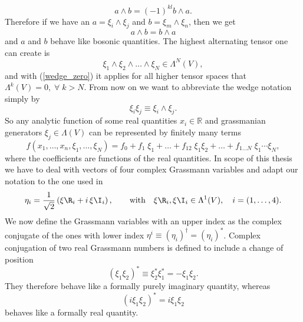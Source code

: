 \begin{equation}
a\wedge b = (-1)^{kl} b\wedge a.
\end{equation}
Therefore if we have an $a=\xi_{i}\wedge\xi_{j}$ and $b=\xi_{m}\wedge\xi_{n}$, then we get
\begin{equation}
a \wedge b = b \wedge a
\end{equation}
and $a$ and $b$ behave like bosonic quantities. The highest alternating tensor one can create is
\begin{equation}
\xi_{1}\wedge\xi_{2}\wedge \ldots\wedge \xi_{N} \in \Lambda^{N}(V),
\end{equation}
and with (\ref{wedge_zero}) it applies for all higher tensor spaces that $\Lambda^{k}(V)=0,\; \forall\; k>N$. From now on we want to abbreviate the wedge notation simply by
\begin{equation}
\xi_{i}\xi_{j} \equiv \xi_{i}\wedge\xi_{j}.
\end{equation}
So any analytic function of some real quantities $x_{i} \in \mathbb{R}$ and grassmanian generators $\xi_{j} \in \Lambda(V)$ can be represented by finitely many terms
\begin{equation}
f(x_{1},\ldots,x_{n},\xi_{1},\ldots,\xi_{N}) = f_{0} + f_{1}\;\xi_{1} +\ldots+ f_{12}\;\xi_{1}\xi_{2} +\ldots+ f_{1\ldots N}\; \xi_{1}\cdots\xi_{N},
\end{equation}
where the coefficients are functions of the real quantities. In scope of this thesis we have to deal with vectors of four complex Grassmann variables and adapt our notation to the one used in \cite{Giombi:2009gd}
\begin{equation}
\eta_{i} =\frac{1}{\sqrt{2}} \left(\xi\R_{i} +i\,\xi\I_{i}\right),\qquad \text{with} \quad \xi\R_{i},\xi\I_{i} \in \Lambda^{1}(V), \quad i=(1,\ldots,4).
\end{equation}
We now define the Grassmann variables with an upper index as the complex conjugate of the ones with lower index $\eta^{i}\equiv \left(\eta_{i}\right)^{\dagger} = \left(\eta_{i}\right)^{\ast}$. Complex conjugation of two real Grassmann numbers is defined to include a change of position
\begin{equation}
\left(\xi_{1}\xi_{2}\right)^{\ast}\equiv \xi_{2}^{\ast}\xi_{1}^{\ast} = -\xi_{1}\xi_{2}.
\end{equation}
They therefore behave like a formally purely imaginary quantity, whereas
\begin{equation}
\left(i\xi_{1}\xi_{2}\right)^{\ast} = i\xi_{1}\xi_{2}
\end{equation}
behaves like a formally real quantity.
%
%
\\[2cm]
%
%
%
%
%
%
%
